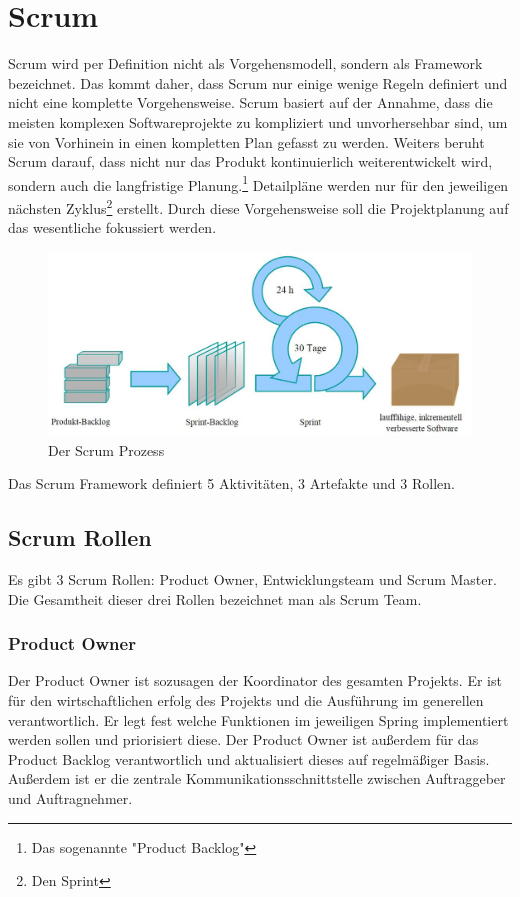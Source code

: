 \documentclass[a4paper, twopage]{scrreprt}
\begin{document}
\chapter{Scrum}
\label{ch:scrum}
Scrum wird per Definition nicht als Vorgehensmodell, sondern als Framework bezeichnet. Das kommt daher, dass Scrum nur einige wenige Regeln definiert und nicht eine komplette Vorgehensweise. Scrum basiert auf der Annahme, dass die meisten komplexen Softwareprojekte zu kompliziert und unvorhersehbar sind, um sie von Vorhinein in einen kompletten Plan gefasst zu werden. 
Weiters beruht Scrum darauf, dass nicht nur das Produkt kontinuierlich weiterentwickelt wird, sondern auch die langfristige Planung.\footnote{Das sogenannte "Product Backlog"} Detailpläne werden nur für den jeweiligen nächsten Zyklus\footnote{Den Sprint} erstellt. Durch diese Vorgehensweise soll die Projektplanung auf das wesentliche fokussiert werden.
\begin{figure}[h]
\centering
	\includegraphics[scale=0.5]{Images/scrum_prozess}
	\caption[Scrum Prozess]{Der Scrum Prozess\cite{wikipedia:scrum}}
	\label{fig:spiralmodell}
\end{figure}
Das Scrum Framework definiert 5 Aktivitäten, 3 Artefakte und 3 Rollen.

\section{Scrum Rollen}
\label{sec:scrum_rollen}
Es gibt 3 Scrum Rollen: Product Owner, Entwicklungsteam und Scrum Master. Die Gesamtheit dieser drei Rollen bezeichnet man als Scrum Team.
\subsection{Product Owner}
Der Product Owner ist sozusagen der Koordinator des gesamten Projekts. Er ist für den wirtschaftlichen erfolg des Projekts und die Ausführung im generellen verantwortlich. Er legt fest welche Funktionen im jeweiligen Spring implementiert werden sollen und priorisiert diese. Der Product Owner ist außerdem für das Product Backlog verantwortlich und aktualisiert dieses auf regelmäßiger Basis. Außerdem ist er die zentrale Kommunikationsschnittstelle zwischen Auftraggeber und Auftragnehmer.
\end{document}
